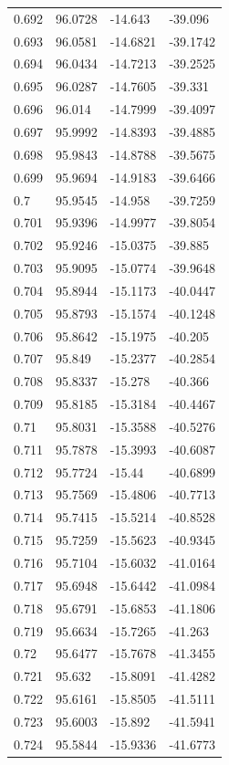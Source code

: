 \begin{tabular}{llll}
0.692 & 96.0728 & -14.643 & -39.096 \\
0.693 & 96.0581 & -14.6821 & -39.1742 \\
0.694 & 96.0434 & -14.7213 & -39.2525 \\
0.695 & 96.0287 & -14.7605 & -39.331 \\
0.696 & 96.014 & -14.7999 & -39.4097 \\
0.697 & 95.9992 & -14.8393 & -39.4885 \\
0.698 & 95.9843 & -14.8788 & -39.5675 \\
0.699 & 95.9694 & -14.9183 & -39.6466 \\
0.7 & 95.9545 & -14.958 & -39.7259 \\
0.701 & 95.9396 & -14.9977 & -39.8054 \\
0.702 & 95.9246 & -15.0375 & -39.885 \\
0.703 & 95.9095 & -15.0774 & -39.9648 \\
0.704 & 95.8944 & -15.1173 & -40.0447 \\
0.705 & 95.8793 & -15.1574 & -40.1248 \\
0.706 & 95.8642 & -15.1975 & -40.205 \\
0.707 & 95.849 & -15.2377 & -40.2854 \\
0.708 & 95.8337 & -15.278 & -40.366 \\
0.709 & 95.8185 & -15.3184 & -40.4467 \\
0.71 & 95.8031 & -15.3588 & -40.5276 \\
0.711 & 95.7878 & -15.3993 & -40.6087 \\
0.712 & 95.7724 & -15.44 & -40.6899 \\
0.713 & 95.7569 & -15.4806 & -40.7713 \\
0.714 & 95.7415 & -15.5214 & -40.8528 \\
0.715 & 95.7259 & -15.5623 & -40.9345 \\
0.716 & 95.7104 & -15.6032 & -41.0164 \\
0.717 & 95.6948 & -15.6442 & -41.0984 \\
0.718 & 95.6791 & -15.6853 & -41.1806 \\
0.719 & 95.6634 & -15.7265 & -41.263 \\
0.72 & 95.6477 & -15.7678 & -41.3455 \\
0.721 & 95.632 & -15.8091 & -41.4282 \\
0.722 & 95.6161 & -15.8505 & -41.5111 \\
0.723 & 95.6003 & -15.892 & -41.5941 \\
0.724 & 95.5844 & -15.9336 & -41.6773 \\

\end{tabular}
